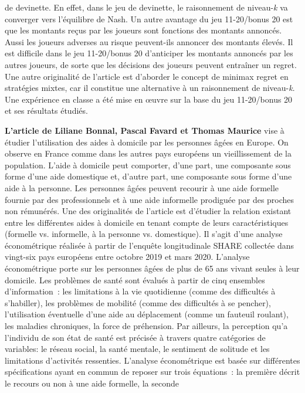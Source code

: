 \begin{Article}
\begin{refsection}[Intro]
de devinette. En effet, dans le jeu de devinette, le raisonnement de
niveau-\emph{k} va converger vers l'équilibre de Nash. Un autre avantage du jeu
11-20/bonus 20 est que les montants reçus par les joueurs sont fonctions
des montants annoncés. Aussi les joueurs adverses au risque peuvent-ils
annoncer des montants élevés. Il est difficile dans le jeu 11-20/bonus
20 d'anticiper les montants annoncés par les autres joueurs, de sorte que
les décisions des joueurs peuvent entraîner un regret. Une autre
originalité de l'article est d'aborder le concept de minimax
regret en stratégies mixtes, car il constitue une alternative à un
raisonnement de niveau-\emph{k}. Une expérience en classe a été mise en œuvre
sur la base du jeu 11-20/bonus 20 et ses résultats étudiés.

\medskip

\textbf{L'article de Liliane Bonnal, Pascal Favard et Thomas Maurice}
vise à étudier l'utilisation des aides à domicile par les personnes
âgées en Europe. On observe en France comme dans les autres pays
européens un vieillissement de la population. L'aide à domicile peut
comporter, d'une part, une composante sous forme d'une aide domestique
et, d'autre part, une composante sous forme d'une aide à la personne.
Les personnes âgées peuvent recourir à une aide formelle fournie
par des professionnels et à une aide informelle prodiguée par des proches non
rémunérés. Une des originalités de l'article est d'étudier la relation
existant entre les différentes aides à domicile en tenant compte de
leurs caractéristiques (formelle vs. informelle, à la personne vs.
domestique). Il s'agit d'une analyse économétrique réalisée à partir de
l'enquête longitudinale SHARE collectée dans vingt-six pays européens
entre octobre 2019 et mars 2020. L'analyse économétrique porte sur les
personnes âgées de plus de 65 ans vivant seules à leur domicile. Les
problèmes de santé sont évalués à partir de cinq ensembles d'information~: les limitations à la vie quotidienne (comme des difficultés à
s'habiller), les problèmes de mobilité (comme des difficultés à se
pencher), l'utilisation éventuelle d'une aide au déplacement (comme un
fauteuil roulant), les maladies chroniques, la force de préhension. Par
ailleurs, la perception qu'a l'individu de son état de santé est
précisée à travers quatre catégories de variables: le réseau social, la
santé mentale, le sentiment de solitude et les limitations d'activités
ressenties. L'analyse économétrique est basée sur différentes
spécifications ayant en commun de reposer sur trois équations~: la
première décrit le recours ou non à une aide formelle, la seconde

\end{refsection}
\end{Article}

